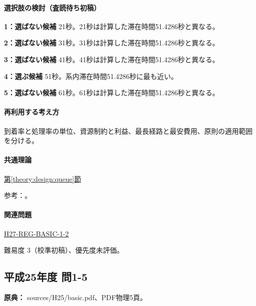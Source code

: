 \paragraph{選択肢の検討（査読待ち初稿）}\mbox{}\par

\noindent\textbf{1：選ばない候補} 21秒。21秒は計算した滞在時間51.4286秒と異なる。\par

\noindent\textbf{2：選ばない候補} 31秒。31秒は計算した滞在時間51.4286秒と異なる。\par

\noindent\textbf{3：選ばない候補} 41秒。41秒は計算した滞在時間51.4286秒と異なる。\par

\noindent\textbf{4：選ぶ候補} 51秒。系内滞在時間51.4286秒に最も近い。\par

\noindent\textbf{5：選ばない候補} 61秒。61秒は計算した滞在時間51.4286秒と異なる。\par

\paragraph{再利用する考え方} 到着率と処理率の単位、資源制約と利益、最長経路と最安費用、原則の適用範囲を分ける。

\paragraph{共通理論} \hyperref[theory:design:queue]{第\ref*{theory:design:queue}節}

\par 参考：\cite{design48_queue_ref}。

\paragraph{関連問題} \hyperref[q:h27-reg-basic-1-2]{H27-REG-BASIC-1-2}

\par 難易度 3（校準初稿）、優先度未評価。

\subsection{平成25年度 問1-5}
\label{q:h25-reg-basic-1-5}

\noindent\textbf{原典：} sources/H25/basic.pdf、PDF物理5頁。

